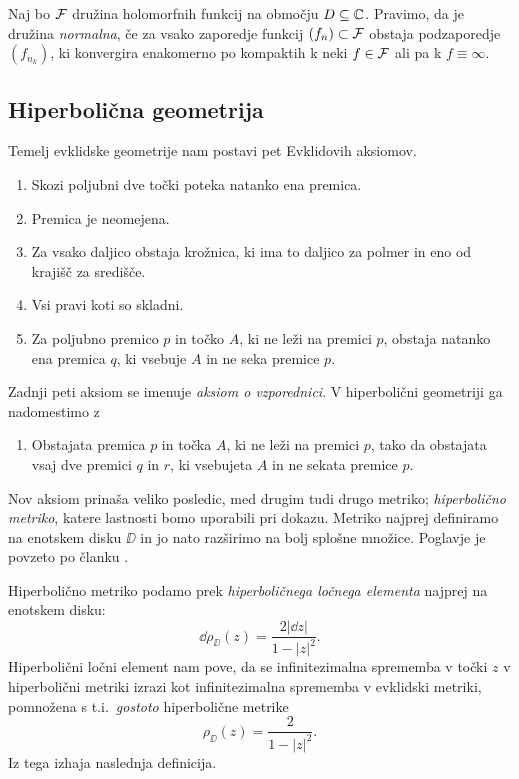 \begin{definicija}
    Naj bo \(\mathcal F\) družina holomorfnih funkcij na območju \(D \subseteq \mathbb C\). Pravimo, da je družina \emph{normalna}, če za vsako zaporedje funkcij \((f_n) \subset \mathcal F\) obstaja podzaporedje \((f_{n_k})\), ki konvergira enakomerno po kompaktih k neki \(f \in \mathcal F\) ali pa k \(f \equiv \infty\).
\end{definicija}

\subsection{Hiperbolična geometrija}

Temelj evklidske geometrije nam postavi pet Evklidovih aksiomov.
\begin{enumerate}
    \item Skozi poljubni dve točki poteka natanko ena premica.
    \item Premica je neomejena.
    \item Za vsako daljico obstaja krožnica, ki ima to daljico za polmer in eno od krajišč za središče.
    \item Vsi pravi koti so skladni.
    \item Za poljubno premico \(p\) in točko \(A\), ki ne leži na premici \(p\), obstaja natanko ena premica \(q\), ki vsebuje \(A\) in ne seka premice \(p\).
\end{enumerate}

\noindent Zadnji peti aksiom se imenuje \emph{aksiom o vzporednici}. V hiperbolični geometriji ga nadomestimo z

\begin{enumerate}[resume]
    \item[5'.] Obstajata premica \(p\) in točka \(A\), ki ne leži na premici \(p\), tako da obstajata vsaj dve premici \(q\) in \(r\), ki vsebujeta \(A\) in ne sekata premice \(p\).
\end{enumerate}

\noindent Nov aksiom prinaša veliko posledic, med drugim tudi drugo metriko; \emph{hiperbolično metriko}, katere lastnosti bomo uporabili pri dokazu. Metriko najprej definiramo na enotskem disku \(\DD\) in jo nato razširimo na bolj splošne množice. Poglavje je povzeto po članku \cite[razdelek 3]{Shen_2015}.

Hiperbolično metriko podamo prek \emph{hiperboličnega ločnega elementa} najprej na enotskem disku:
\[\dd \rho_{\DD} (z) = \frac{2 |\dd z|}{1 - |z|^2}.\]
Hiperbolični ločni element nam pove, da se infinitezimalna sprememba v točki \(z\) v hiperbolični metriki izrazi kot infinitezimalna sprememba v evklidski metriki, pomnožena s t.i.~\emph{gostoto} hiperbolične metrike
\[\rho_{\DD} (z) = \frac{2}{1 - |z|^2}.\]
Iz tega izhaja naslednja definicija.

